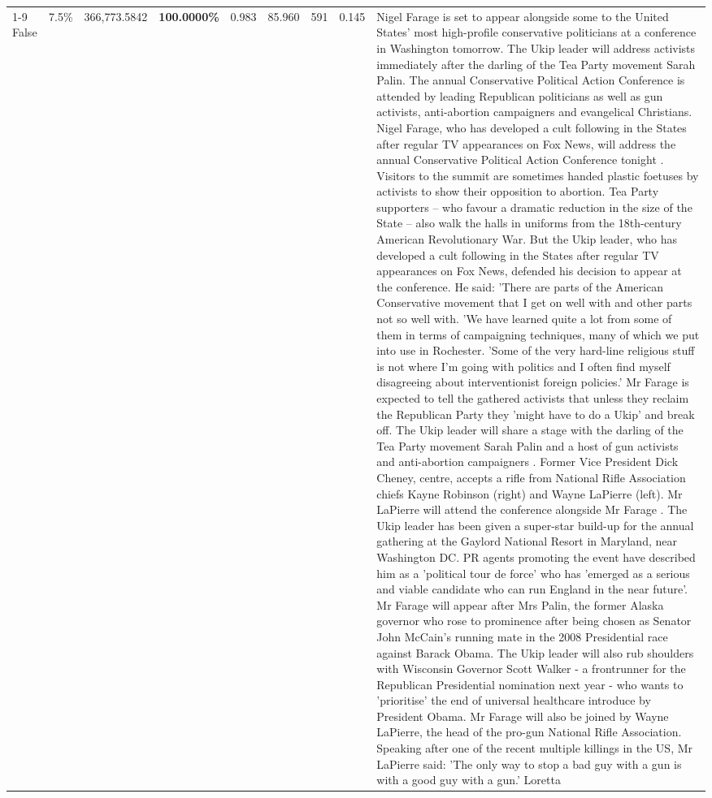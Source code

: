 \begin{table}[H]
\begin{tabular}{lllrlllll}
\cline{1-9} \cline{2-9}
False & 7.5\% & 366,773.5842 & \bfseries \color{red} 100.0000\% & 0.983 & 85.960 & 591 & 0.145 & Nigel Farage is set to appear alongside some to the United States' most high-profile conservative politicians at a conference in Washington tomorrow. The Ukip leader will address activists immediately after the darling of the Tea Party movement Sarah Palin. The annual Conservative Political Action Conference is attended by leading Republican politicians as well as gun activists, anti-abortion campaigners and evangelical Christians. Nigel Farage, who has developed a cult following in the States after regular TV appearances on Fox News, will address the annual Conservative Political Action Conference tonight . Visitors to the summit are sometimes handed plastic foetuses by activists to show their opposition to abortion. Tea Party supporters – who favour a dramatic reduction in the size of the State – also walk the halls in uniforms from the 18th-century American Revolutionary War. But the Ukip leader, who has developed a cult following in the States after regular TV appearances on Fox News, defended his decision to appear at the conference. He said: 'There are parts of the American Conservative movement that I get on well with and other parts not so well with. 'We have learned quite a lot from some of them in terms of campaigning techniques, many of which we put into use in Rochester. 'Some of the very hard-line religious stuff is not where I'm going with politics and I often find myself disagreeing about interventionist foreign policies.' Mr Farage is expected to tell the gathered activists that unless they reclaim the Republican Party they 'might have to do a Ukip' and break off. The Ukip leader will share a stage with the darling of the Tea Party movement Sarah Palin and a host of gun activists and anti-abortion campaigners . Former Vice President Dick Cheney, centre, accepts a rifle from National Rifle Association chiefs Kayne Robinson (right) and Wayne LaPierre (left). Mr LaPierre will attend the conference alongside Mr Farage . The Ukip leader has been given a super-star build-up for the annual gathering at the Gaylord National Resort in Maryland, near Washington DC. PR agents promoting the event have described him as a 'political tour de force' who has 'emerged as a serious and viable candidate who can run England in the near future'. Mr Farage will appear after Mrs Palin, the former Alaska governor who rose to prominence after being chosen as Senator John McCain's running mate in the 2008 Presidential race against Barack Obama. The Ukip leader will also rub shoulders with Wisconsin Governor Scott Walker - a frontrunner for the Republican Presidential nomination next year - who wants to 'prioritise' the end of universal healthcare introduce by President Obama. Mr Farage will also be joined by Wayne LaPierre, the head of the pro-gun National Rifle Association. Speaking after one of the recent multiple killings in the US, Mr LaPierre said: 'The only way to stop a bad guy with a gun is with a good guy with a gun.' Loretta \\

\end{tabular}
\end{table}
